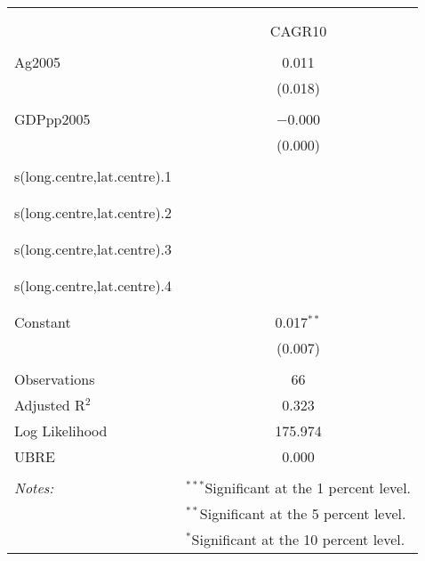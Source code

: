 
\begin{table}[!htbp] \centering 
  \caption{} 
  \label{} 
\begin{tabular}{@{\extracolsep{5pt}}lc} 
\\[-1.8ex]\hline 
\hline \\[-1.8ex] 
\\[-1.8ex] & CAGR10 \\ 
\hline \\[-1.8ex] 
 Ag2005 & 0.011 \\ 
  & (0.018) \\ 
  & \\ 
 GDPpp2005 & $-$0.000 \\ 
  & (0.000) \\ 
  & \\ 
 s(long.centre,lat.centre).1 &  \\ 
  &  \\ 
  & \\ 
 s(long.centre,lat.centre).2 &  \\ 
  &  \\ 
  & \\ 
 s(long.centre,lat.centre).3 &  \\ 
  &  \\ 
  & \\ 
 s(long.centre,lat.centre).4 &  \\ 
  &  \\ 
  & \\ 
 Constant & 0.017$^{**}$ \\ 
  & (0.007) \\ 
  & \\ 
Observations & 66 \\ 
Adjusted R$^{2}$ & 0.323 \\ 
Log Likelihood & 175.974 \\ 
UBRE & 0.000 \\ 
\hline \\[-1.8ex] 
\textit{Notes:} & \multicolumn{1}{l}{$^{***}$Significant at the 1 percent level.} \\ 
 & \multicolumn{1}{l}{$^{**}$Significant at the 5 percent level.} \\ 
 & \multicolumn{1}{l}{$^{*}$Significant at the 10 percent level.} \\ 
\end{tabular} 
\end{table} 
